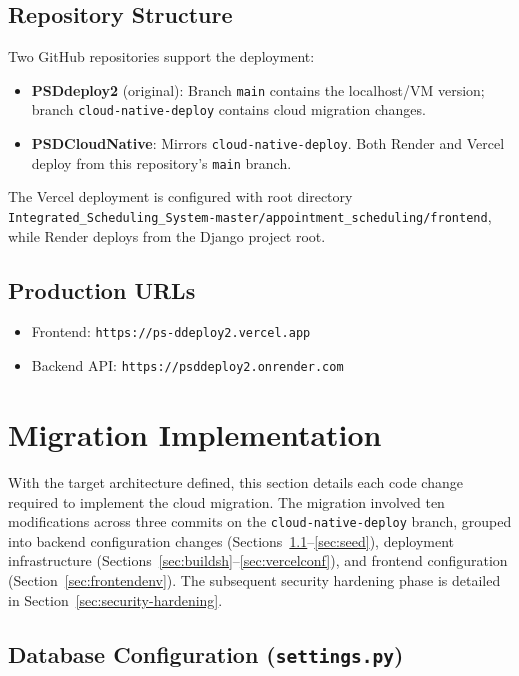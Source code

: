 \documentclass[conference]{IEEEtran}
\begin{document}
\subsection{Repository Structure}

Two GitHub repositories support the deployment:

\begin{itemize}
    \item \textbf{PSDdeploy2} (original): Branch \texttt{main} contains the localhost/VM version; branch \texttt{cloud-native-deploy} contains cloud migration changes.
    \item \textbf{PSDCloudNative}: Mirrors \texttt{cloud-native-deploy}. Both Render and Vercel deploy from this repository's \texttt{main} branch.
\end{itemize}

The Vercel deployment is configured with root directory \texttt{Integrated\_Scheduling\_System-master/\allowbreak appointment\_scheduling/\allowbreak frontend}, while Render deploys from the Django project root.

\subsection{Production URLs}

\begin{itemize}
    \item Frontend: \texttt{https://ps-ddeploy2.vercel.app}
    \item Backend API: \texttt{https://psddeploy2.\allowbreak onrender.com}
\end{itemize}

\section{Migration Implementation}

With the target architecture defined, this section details each code change required to implement the cloud migration. The migration involved ten modifications across three commits on the \texttt{cloud-native-deploy} branch, grouped into backend configuration changes (Sections~\ref{sec:dbconfig}--\ref{sec:seed}), deployment infrastructure (Sections~\ref{sec:buildsh}--\ref{sec:vercelconf}), and frontend configuration (Section~\ref{sec:frontendenv}). The subsequent security hardening phase is detailed in Section~\ref{sec:security-hardening}.

\subsection{Database Configuration (\texttt{settings.py})}
\label{sec:dbconfig}
\end{document}
